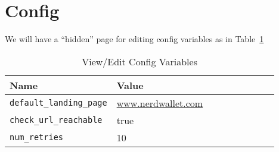 \documentclass[letterpaper]{article}
\begin{document}
\section{Config}
We will have a ``hidden'' page for editing config variables as in
Table~\ref{tbl_config}

\begin{table}[hb]
\centering
\begin{tabular}{|l||l|l|l|l|l|l|l|l|}  \hline \hline
  {\bf Name } & {\bf Value} \\ \hline \hline
  \verb+default_landing_page+ & \url{www.nerdwallet.com} \\ \hline
\verb+check_url_reachable+ & true \\ \hline
  \verb+num_retries+ & 10 \\ \hline 
\hline
\end{tabular}
\caption{View/Edit Config Variables}
\label{tbl_config}
\end{table}
\end{document}

